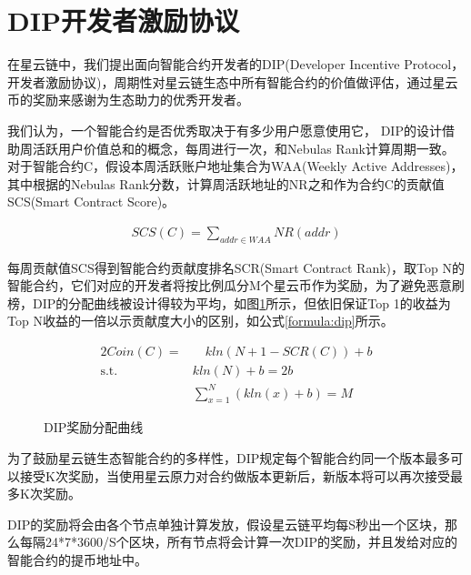 \section{DIP开发者激励协议}
\label{sec:dip}

在星云链中，我们提出面向智能合约开发者的DIP(Developer Incentive Protocol，开发者激励协议)，周期性对星云链生态中所有智能合约的价值做评估，通过星云币的奖励来感谢为生态助力的优秀开发者。

我们认为，一个智能合约是否优秀取决于有多少用户愿意使用它，
DIP的设计借助周活跃用户价值总和的概念，每周进行一次，和Nebulas Rank计算周期一致。对于智能合约C，假设本周活跃账户地址集合为WAA(Weekly Active Addresses)，其中根据的Nebulas Rank分数，计算周活跃地址的NR之和作为合约C的贡献值SCS(Smart Contract Score)。

\begin{align}
SCS(C)=\sum_{addr \in WAA}NR(addr)
\end{align}

每周贡献值SCS得到智能合约贡献度排名SCR(Smart Contract Rank)，取Top N的智能合约，它们对应的开发者将按比例瓜分M个星云币作为奖励，为了避免恶意刷榜，DIP的分配曲线被设计得较为平均，如图\ref{fig:dip}所示，但依旧保证Top 1的收益为Top N收益的一倍以示贡献度大小的区别，如公式\ref{formula:dip}所示。

\begin{alignat}{2}
Coin(C) = & \quad kln(N+1-SCR(C))+b \label{formula:dip} \\
\mbox{s.t.}\quad & kln(N) + b = 2b \nonumber \\
& \sum_{x=1}^{N}(kln(x) + b) = M \nonumber
\end{alignat}

\begin{figure}[h] 
\centering
{}
\label{fig:dip}
\caption{DIP奖励分配曲线}
\end{figure}

为了鼓励星云链生态智能合约的多样性，DIP规定每个智能合约同一个版本最多可以接受K次奖励，当使用星云原力对合约做版本更新后，新版本将可以再次接受最多K次奖励。

DIP的奖励将会由各个节点单独计算发放，假设星云链平均每S秒出一个区块，那么每隔24*7*3600/S个区块，所有节点将会计算一次DIP的奖励，并且发给对应的智能合约的提币地址中。

